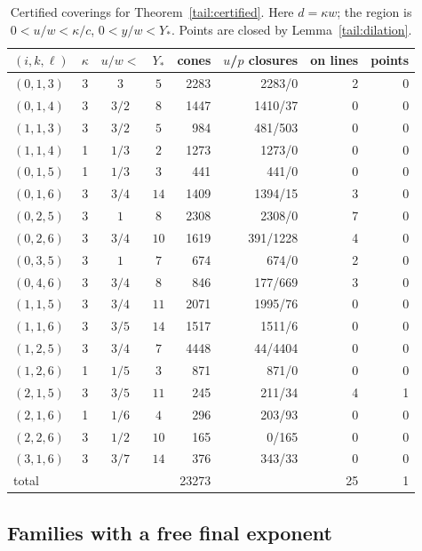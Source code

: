 \begin{table}[ht]\centering\small
\begin{tabular}{lcccrrrr}
\toprule
\((i,k,\ell)\) & \(\kappa\) & \(u/w<\) & \(Y_*\) & cones & \(u\)/\(p\) closures & on lines & points\\
\midrule
\((0,1,3)\) & 3 & \(3\) & \(5\) & 2283 & 2283/0 & 2 & 0\\
\((0,1,4)\) & 3 & \(3/2\) & \(8\) & 1447 & 1410/37 & 0 & 0\\
\((1,1,3)\) & 3 & \(3/2\) & \(5\) & 984 & 481/503 & 0 & 0\\
\((1,1,4)\) & 1 & \(1/3\) & \(2\) & 1273 & 1273/0 & 0 & 0\\
\((0,1,5)\) & 1 & \(1/3\) & \(3\) & 441 & 441/0 & 0 & 0\\
\((0,1,6)\) & 3 & \(3/4\) & \(14\) & 1409 & 1394/15 & 3 & 0\\
\((0,2,5)\) & 3 & \(1\) & \(8\) & 2308 & 2308/0 & 7 & 0\\
\((0,2,6)\) & 3 & \(3/4\) & \(10\) & 1619 & 391/1228 & 4 & 0\\
\((0,3,5)\) & 3 & \(1\) & \(7\) & 674 & 674/0 & 2 & 0\\
\((0,4,6)\) & 3 & \(3/4\) & \(8\) & 846 & 177/669 & 3 & 0\\
\((1,1,5)\) & 3 & \(3/4\) & \(11\) & 2071 & 1995/76 & 0 & 0\\
\((1,1,6)\) & 3 & \(3/5\) & \(14\) & 1517 & 1511/6 & 0 & 0\\
\((1,2,5)\) & 3 & \(3/4\) & \(7\) & 4448 & 44/4404 & 0 & 0\\
\((1,2,6)\) & 1 & \(1/5\) & \(3\) & 871 & 871/0 & 0 & 0\\
\((2,1,5)\) & 3 & \(3/5\) & \(11\) & 245 & 211/34 & 4 & 1\\
\((2,1,6)\) & 1 & \(1/6\) & \(4\) & 296 & 203/93 & 0 & 0\\
\((2,2,6)\) & 3 & \(1/2\) & \(10\) & 165 & 0/165 & 0 & 0\\
\((3,1,6)\) & 3 & \(3/7\) & \(14\) & 376 & 343/33 & 0 & 0\\
\midrule
total & & & & 23273 & & 25 & 1\\
\bottomrule
\end{tabular}
\caption{Certified coverings for Theorem~\ref{tail:certified}. Here \(d=\kappa w\); the region is \(0<u/w<\kappa/c\), \(0<y/w<Y_*\). Points are closed by Lemma~\ref{tail:dilation}.}\label{tab:cert}
\end{table}




\subsection{Families with a free final exponent}\label{tail:fam-sec}


